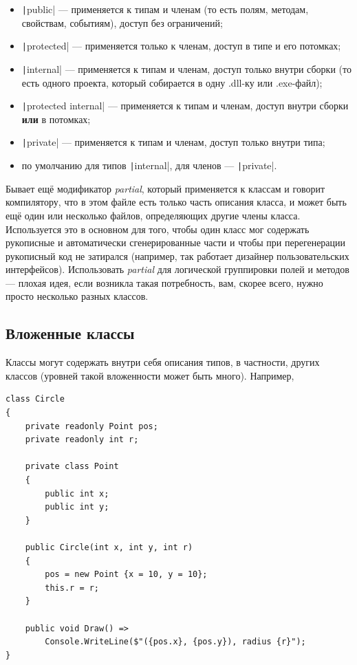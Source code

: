 \documentclass[a5paper]{article}
\begin{document}
\begin{itemize}
    \item \texttt|public| --- применяется к типам и членам (то есть полям, методам, свойствам, событиям), доступ без ограничений;
    \item \texttt|protected| --- применяется только к членам, доступ в типе и его потомках;
    \item \texttt|internal| --- применяется к типам и членам, доступ только внутри сборки (то есть одного проекта, который собирается в одну .dll-ку или .exe-файл);
    \item \texttt|protected internal| --- применяется к типам и членам, доступ внутри сборки \textbf{или} в потомках;
    \item \texttt|private| --- применяется к типам и членам, доступ только внутри типа;
    \item по умолчанию для типов \texttt|internal|, для членов --- \texttt|private|.
\end{itemize}

Бывает ещё модификатор \textit{partial}, который применяется к классам и говорит компилятору, что в этом файле есть только часть описания класса, и может быть ещё один или несколько файлов, определяющих другие члены класса. Используется это в основном для того, чтобы один класс мог содержать рукописные и автоматически сгенерированные части и чтобы при перегенерации рукописный код не затирался (например, так работает дизайнер пользовательских интерфейсов). Использовать \textit{partial} для логической группировки полей и методов --- плохая идея, если возникла такая потребность, вам, скорее всего, нужно просто несколько разных классов.

\subsection{Вложенные классы}

Классы могут содержать внутри себя описания типов, в частности, других классов (уровней такой вложенности может быть много). Например,

\begin{verbatim}
class Circle
{
    private readonly Point pos;
    private readonly int r;

    private class Point
    {
        public int x;
        public int y;
    }

    public Circle(int x, int y, int r)
    {
        pos = new Point {x = 10, y = 10};
        this.r = r;
    }

    public void Draw() =>
        Console.WriteLine($"({pos.x}, {pos.y}), radius {r}");
}
\end{verbatim}
\end{document}
